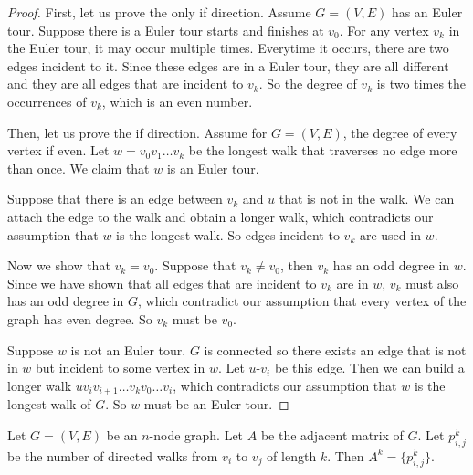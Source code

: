 \documentclass[11pt]{article}
\begin{document}
\begin{proof}
First, let us prove the only if direction. Assume $G=(V,E)$ has an Euler tour. Suppose there is a
Euler tour starts and finishes at $v_0$. For any vertex $v_k$ in the Euler tour, it may occur
multiple times. Everytime it occurs, there are two edges incident to it. Since these edges are in
a Euler tour, they are all different and they are all edges that are incident to $v_k$. So the
degree of $v_k$ is two times the occurrences of $v_k$, which is an even number.

Then, let us prove the if direction. Assume for $G=(V,E)$, the degree of every vertex if even. Let
$w = v_0v_1 \dots v_k$ be the longest walk that traverses no edge more than once. We claim that
$w$ is an Euler tour.

Suppose that there is an edge between $v_k$ and $u$ that is not in the walk. We can attach the edge
to the walk and obtain a longer walk, which contradicts our assumption that $w$ is the longest
walk. So edges incident to $v_k$ are used in $w$.

Now we show that $v_k=v_0$. Suppose that $v_k \neq v_0$, then $v_k$ has an odd degree in $w$.
Since we have shown that all edges that are incident to $v_k$ are in $w$, $v_k$ must also has an
odd degree in $G$, which contradict our assumption that every vertex of the graph has even degree.
So $v_k$ must be $v_0$.

Suppose $w$ is not an Euler tour. $G$ is connected so there exists an edge that is not in $w$ but
incident to some vertex in $w$. Let $u$-$v_i$ be this edge. Then we can build a longer walk
$uv_iv_{i+1} \dots v_kv_0 \dots v_i$, which contradicts our assumption that $w$ is the longest walk
of $G$. So $w$ must be an Euler tour.
\end{proof}

\begin{theorem}
Let $G=(V,E)$ be an $n$-node graph. Let $A$ be the adjacent matrix of $G$. Let $p_{i,j}^k$ be the
number of directed walks from $v_i$ to $v_j$ of length $k$. Then $A^k = \{p_{i,j}^k\}$.
\end{theorem}
\end{document}
